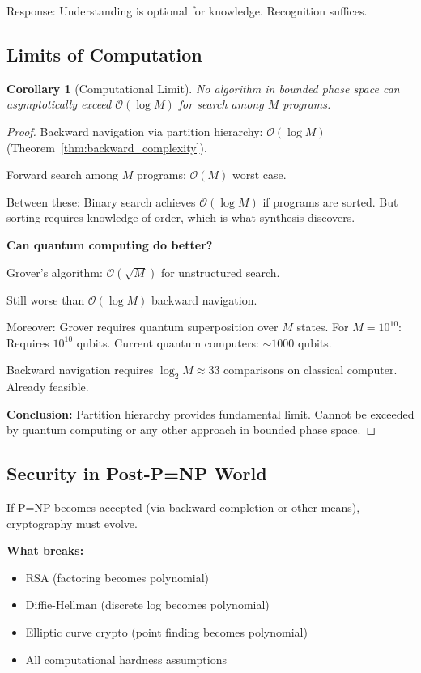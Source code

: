 \documentclass[twocolumn,10pt]{article}
\newtheorem{corollary}[theorem]{Corollary}
\theoremstyle{definition}
\theoremstyle{remark}
\newcommand{\bigO}{\mathcal{O}}
\begin{document}
Response: Understanding is optional for knowledge. Recognition suffices.

\subsection{Limits of Computation}

\begin{corollary}[Computational Limit]
\label{cor:comp_limit}
No algorithm in bounded phase space can asymptotically exceed $\bigO(\log M)$ for search among $M$ programs.
\end{corollary}

\begin{proof}
Backward navigation via partition hierarchy: $\bigO(\log M)$ (Theorem~\ref{thm:backward_complexity}).

Forward search among $M$ programs: $\bigO(M)$ worst case.

Between these: Binary search achieves $\bigO(\log M)$ if programs are sorted. But sorting requires knowledge of order, which is what synthesis discovers.

\vspace{0.2cm}
\noindent\textbf{Can quantum computing do better?}

Grover's algorithm\cite{grover1996}: $\bigO(\sqrt{M})$ for unstructured search.

Still worse than $\bigO(\log M)$ backward navigation.

Moreover: Grover requires quantum superposition over $M$ states. For $M=10^{10}$: Requires $10^{10}$ qubits. Current quantum computers: $\sim 1000$ qubits.

Backward navigation requires $\log_2 M \approx 33$ comparisons on classical computer. Already feasible.

\vspace{0.2cm}
\noindent\textbf{Conclusion:} Partition hierarchy provides fundamental limit. Cannot be exceeded by quantum computing or any other approach in bounded phase space.
\end{proof}

\subsection{Security in Post-P=NP World}

If P=NP becomes accepted (via backward completion or other means), cryptography must evolve.

\vspace{0.2cm}
\noindent\textbf{What breaks:}
\begin{itemize}
\item RSA (factoring becomes polynomial)
\item Diffie-Hellman (discrete log becomes polynomial)
\item Elliptic curve crypto (point finding becomes polynomial)
\item All computational hardness assumptions
\end{itemize}
\end{document}
